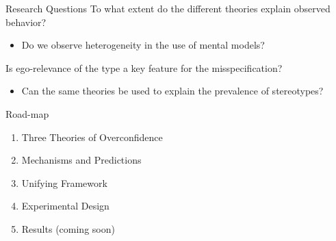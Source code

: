 \documentclass[aspectratio=169]{beamer}
\begin{document}
\begin{frame}{Research Questions}
    To what extent do the different theories explain observed behavior?\\
    \begin{itemize}
        \item Do we observe heterogeneity in the use of mental models?
    \end{itemize}
    \bigskip
    Is ego-relevance of the type a key feature for the misspecification?
    \begin{itemize}
        \item Can the same theories be used to explain the prevalence of stereotypes?
    \end{itemize}
\end{frame}

\begin{frame}{Road-map}
    \begin{enumerate}
        \item Three Theories of Overconfidence\\
        \bigskip
        \item Mechanisms and Predictions\\
        \bigskip
        \item Unifying Framework\\
        \bigskip
        \item Experimental Design\\
        \bigskip
        \item Results (coming soon)
    \end{enumerate}
\end{frame}
\end{document}
